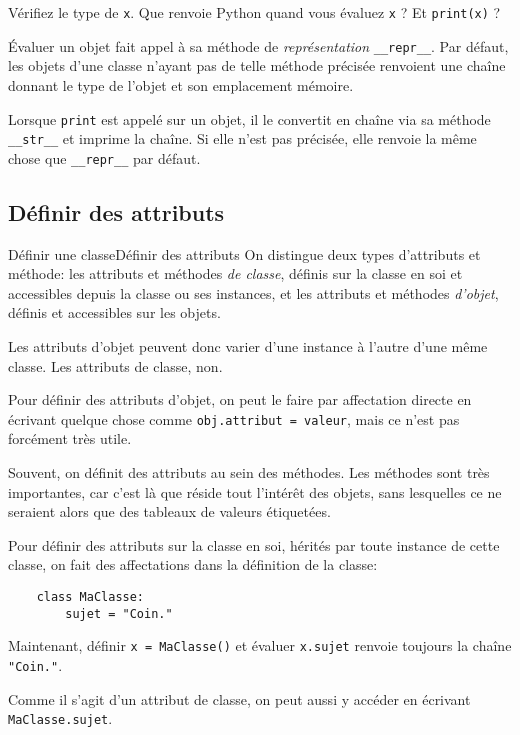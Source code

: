 \begin{frame}[fragile]
	\begin{exem}
		Vérifiez le type de \lstinline|x|. Que renvoie Python quand vous évaluez \lstinline|x| ? Et \lstinline|print(x)| ?
	\end{exem}
	\pause
	
	Évaluer un objet fait appel à sa méthode de \textit{représentation} \lstinline|__repr__|. Par défaut, les objets d'une classe n'ayant pas de telle méthode précisée renvoient une chaîne donnant le type de l'objet et son emplacement mémoire.\pause
	
	Lorsque \lstinline|print| est appelé sur un objet, il le convertit en chaîne via sa méthode \lstinline|__str__| et imprime la chaîne. Si elle n'est pas précisée, elle renvoie la même chose que \lstinline|__repr__| par défaut.
\end{frame}


\subsection{Définir des attributs}

\begin{frame}[fragile]{Définir une classe}{Définir des attributs}
	On distingue deux types d'attributs et méthode: les attributs et méthodes \textit{de classe}, définis sur la classe en soi et accessibles depuis la classe ou ses instances, et les attributs et méthodes \textit{d'objet}, définis et accessibles sur les objets.\pause
	
	Les attributs d'objet peuvent donc varier d'une instance à l'autre d'une même classe. Les attributs de classe, non.
\end{frame}	

\begin{frame}[fragile]
	Pour définir des attributs d'objet, on peut le faire par affectation directe en écrivant quelque chose comme \lstinline|obj.attribut = valeur|, mais ce n'est pas forcément très utile.\pause
	
	Souvent, on définit des attributs au sein des méthodes. Les méthodes sont très importantes, car c'est là que réside tout l'intérêt des objets, sans lesquelles ce ne seraient alors que des tableaux de valeurs étiquetées.
\end{frame}


\begin{frame}[fragile]
	Pour définir des attributs sur la classe en soi, hérités par toute instance de cette classe, on fait des affectations dans la définition de la classe:
	\begin{lstlisting}
	class MaClasse:
		sujet = "Coin."
	\end{lstlisting}\pause
	
	Maintenant, définir \lstinline|x = MaClasse()| et évaluer \lstinline|x.sujet| renvoie toujours la chaîne \lstinline|"Coin."|.
	
	Comme il s'agit d'un attribut de classe, on peut aussi y accéder en écrivant \lstinline|MaClasse.sujet|.
\end{frame}

